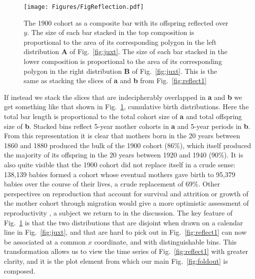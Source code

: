 \documentclass{article}
\begin{document}
\pagebreak
\begin{figure}
 \centering
        \texttt{[image: Figures/FigReflection.pdf]}
        \caption{The 1900 cohort as a composite bar with its offspring reflected over $y$. The size of each bar stacked in the top composition is proportional to the area of its corresponding polygon in the left distribution \textbf{A} of Fig.~\ref{fig:juxt}. The size of each bar stacked in the lower composition is proportional to the area of its corresponding polygon in the right distribution \textbf{B} of Fig.~\ref{fig:juxt}. This is the same as stacking the slices of \textbf{a} and \textbf{b} from Fig.~\ref{fig:reflect1} }
          \label{fig:refl}
\end{figure}
If instead we stack the slices that are indecipherably overlapped in \textbf{a} and \textbf{b} we get something like that shown in Fig.~\ref{fig:refl}, cumulative birth distributions. %
Here the total bar length is proportional to the total cohort size of \textbf{a} and total offspring size of \textbf{b}. Stacked bins reflect 5-year mother cohorts in \textbf{a} and 5-year periods in \textbf{b}. From this representation it is clear that mothers born in the 20 years between 1860 and 1880 produced the bulk of the 1900 cohort (86\%), which itself produced the majority of its offspring in the 20 years between 1920 and 1940 (90\%). It is also quite visible that the 1900 cohort did not replace itself in a crude sense: 138,139 babies formed a cohort whose eventual mothers gave birth to 95,379 babies over the course of their lives, a crude replacement of 69\%. Other perspectives on reproduction that account for survival and attrition or growth of the mother cohort through migration would give a more optimistic assessment of reproductivity \citep{henry1965reflexions}, a subject we return to in the discussion. The key feature of Fig.~\ref{fig:refl} is that the two distributions that are disjoint when drawn on a calendar line in Fig.~\ref{fig:juxt}, and that are hard to pick out in Fig.~\ref{fig:reflect1} can now be associated at a common $x$ coordinate, and with distinguishable bins. This transformation allows us to view the time series of Fig.~\ref{fig:reflect1} with greater clarity, and it is the plot element from which our main Fig.~\ref{fig:foldout} is composed. 
\end{document}
